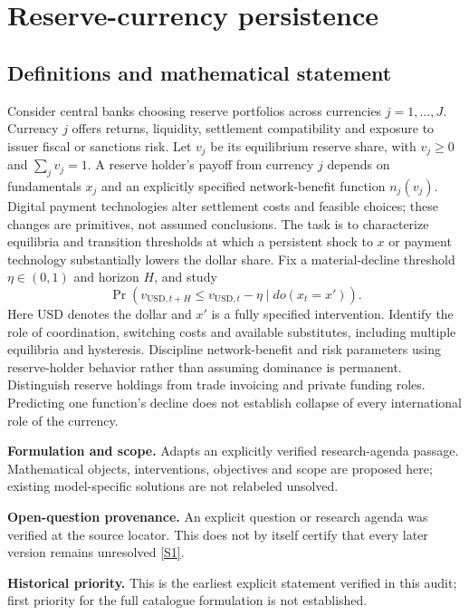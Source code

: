 \documentclass[11pt]{article}
\newcommand{\sref}[2]{\hyperlink{source:#1:#2}{[S#2]}}
\begin{document}
\section*{Reserve-currency persistence}\label{30007616}
\subsection{Definitions and mathematical statement}
Consider central banks choosing reserve portfolios across currencies \(j=1,\ldots,J\). Currency \(j\) offers returns, liquidity, settlement compatibility and exposure to issuer fiscal or sanctions risk. Let \(v_j\) be its equilibrium reserve share, with \(v_j\geq0\) and \(\sum_jv_j=1\). A reserve holder's payoff from currency \(j\) depends on fundamentals \(x_j\) and an explicitly specified network-benefit function \(n_j(v_j)\). Digital payment technologies alter settlement costs and feasible choices; these changes are primitives, not assumed conclusions. The task is to characterize equilibria and transition thresholds at which a persistent shock to \(x\) or payment technology substantially lowers the dollar share. Fix a material-decline threshold \(\eta\in(0,1)\) and horizon \(H\), and study
\[\Pr(v_{\mathrm{USD},t+H}\leq v_{\mathrm{USD},t}-\eta\mid do(x_t=x')).\]
Here USD denotes the dollar and \(x'\) is a fully specified intervention. Identify the role of coordination, switching costs and available substitutes, including multiple equilibria and hysteresis. Discipline network-benefit and risk parameters using reserve-holder behavior rather than assuming dominance is permanent. Distinguish reserve holdings from trade invoicing and private funding roles. Predicting one function's decline does not establish collapse of every international role of the currency.

\par\textbf{Formulation and scope.} Adapts an explicitly verified research-agenda passage. Mathematical objects, interventions, objectives and scope are proposed here; existing model-specific solutions are not relabeled unsolved.

\par\textbf{Open-question provenance.} An explicit question or research agenda was verified at the source locator. This does not by itself certify that every later version remains unresolved \sref{30007616}{1}.

\par\textbf{Historical priority.} This is the earliest explicit statement verified in this audit; first priority for the full catalogue formulation is not established.
\end{document}

